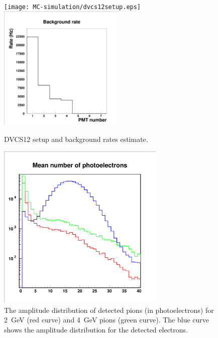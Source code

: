  
\begin{figure}[htbp]
\centering
\texttt{[image: MC-simulation/dvcs12setup.eps]}
\includegraphics[height=6cm,angle=0]{MC-simulation/backgr2.eps}
\caption{\small{DVCS12 setup and background rates estimate.}}
\label{background2}
\end{figure}


\begin{figure}[htbp]
\centering
\includegraphics[height=8cm,angle=0]{MC-simulation/pions_nphe.eps}
\caption{\small{The amplitude distribution of detected pions (in 
photoelectrons) for 2~GeV (red curve) and 4~GeV pions (green curve).
The blue curve shows the amplitude distribution for the detected electrons.}}
\label{pions_nphe}
\end{figure}

